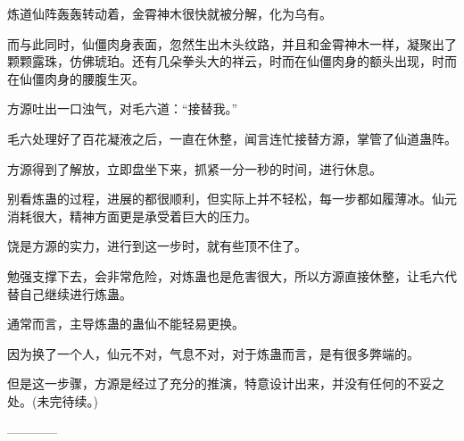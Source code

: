 \begin{this_body}
炼道仙阵轰轰转动着，金霄神木很快就被分解，化为乌有。

而与此同时，仙僵肉身表面，忽然生出木头纹路，并且和金霄神木一样，凝聚出了颗颗露珠，仿佛琥珀。还有几朵拳头大的祥云，时而在仙僵肉身的额头出现，时而在仙僵肉身的腰腹生灭。

方源吐出一口浊气，对毛六道：“接替我。”

毛六处理好了百花凝液之后，一直在休整，闻言连忙接替方源，掌管了仙道蛊阵。

方源得到了解放，立即盘坐下来，抓紧一分一秒的时间，进行休息。

别看炼蛊的过程，进展的都很顺利，但实际上并不轻松，每一步都如履薄冰。仙元消耗很大，精神方面更是承受着巨大的压力。

饶是方源的实力，进行到这一步时，就有些顶不住了。

勉强支撑下去，会非常危险，对炼蛊也是危害很大，所以方源直接休整，让毛六代替自己继续进行炼蛊。

通常而言，主导炼蛊的蛊仙不能轻易更换。

因为换了一个人，仙元不对，气息不对，对于炼蛊而言，是有很多弊端的。

但是这一步骤，方源是经过了充分的推演，特意设计出来，并没有任何的不妥之处。(未完待续。)

------------

\end{this_body}

